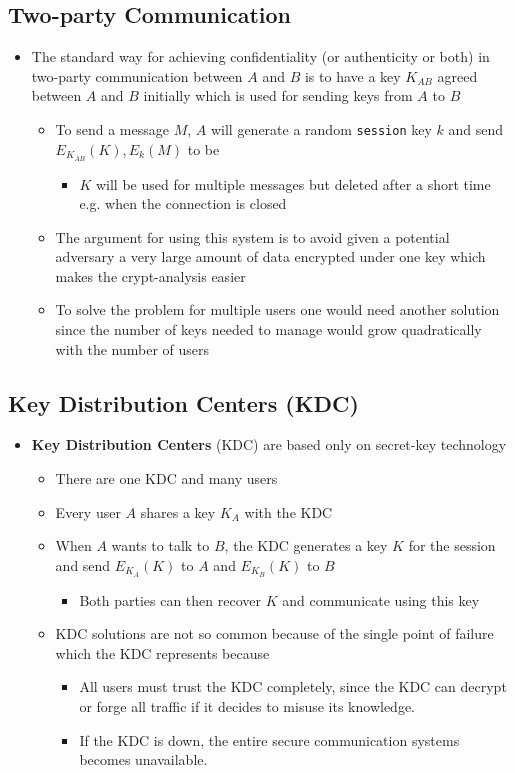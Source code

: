 \documentclass[11pt]{article}
\begin{document}
\subsection{Two-party Communication}
\label{sec:orgd4ad12d}
\begin{itemize}
\item The standard way for achieving confidentiality (or authenticity or both) in two-party communication between \(A\) and \(B\) is to have a key \(K_{AB}\) agreed between \(A\) and \(B\) initially which is used for sending keys from \(A\) to \(B\)
\begin{itemize}
\item To send a message \(M\), \(A\) will generate a random \texttt{session} key \(k\) and send \(E_{K_{AB}}(K), E_k(M)\) to be
\begin{itemize}
\item \(K\) will be used for multiple messages but deleted after a short time e.g. when the connection is closed
\end{itemize}
\item The argument for using this system is to avoid given a potential adversary a very large amount of data encrypted under one key which makes the crypt-analysis easier
\item To solve the problem for multiple users one would need another solution since the number of keys needed to manage would grow quadratically with the number of users
\end{itemize}
\end{itemize}

\subsection{Key Distribution Centers (KDC)}
\label{sec:org4227a6f}
\begin{itemize}
\item \textbf{Key Distribution Centers} (KDC) are based only on secret-key technology
\begin{itemize}
\item There are one KDC and many users
\item Every user \(A\) shares a key \(K_A\) with the KDC
\item When \(A\) wants to talk to \(B\), the KDC generates a key \(K\) for the session and send \(E_{K_A}(K)\) to \(A\) and \(E_{K_B}(K)\) to \(B\)
\begin{itemize}
\item Both parties can then recover \(K\) and communicate using this key
\end{itemize}
\item KDC solutions are not so common because of the single point of failure which the KDC represents because
\begin{itemize}
\item All users must trust the KDC completely, since the KDC can decrypt or forge all traffic if it decides to misuse its knowledge.
\item If the KDC is down, the entire secure communication systems becomes unavailable.
\end{itemize}
\end{itemize}
\end{itemize}
\end{document}
